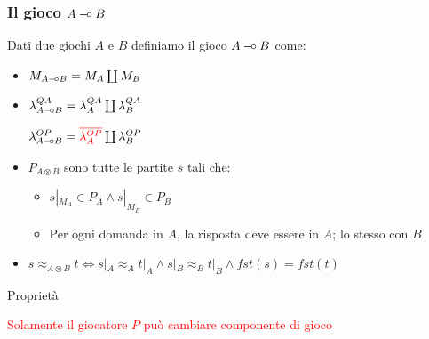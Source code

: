 \documentclass{beamer}
\newcommand{\limp}{\mathbin{{-}\mkern-3.5mu{\circ}}}
\begin{document}
\begin{frame}[t]






	
\end{frame}


\begin{frame}
	
	\frametitle{Il gioco $A \limp B$}
	Dati due giochi $A$ e $B$ definiamo il gioco $A\limp B$ come:
	\begin{itemize}
		\item<2-> $M_{A\limp B}=M_A \coprod M_B$
		\item<3-> $\lambda^{QA}_{A\limp B}=\lambda^{QA}_A \coprod \lambda^{QA}_B$
		
		$\lambda^{OP}_{A\limp B}=\textcolor{red}{\overline{\lambda^{OP}_A}} \coprod \lambda^{OP}_B$
		\item<4-> $P_{A\otimes B}$ sono tutte le partite $s$ tali che:
		\begin{itemize}
			\item $s|_{M_A} \in P_A \wedge s|_{M_B} \in P_B$
			\item Per ogni domanda in $A$, la risposta deve essere in $A$; lo stesso con $B$
		\end{itemize}
		\item<5-> $s\approx_{A\otimes B} t \Leftrightarrow s|_A \approx_A t|_A \wedge s|_B \approx_B t|_B \wedge fst(s)=fst(t)$ 
	\end{itemize}
	\begin{block}{Proprietà}
		
		\textcolor{red}{Solamente il giocatore $P$ può cambiare componente di gioco}
		
	
	\end{block}
	
\end{frame}
\end{document}
